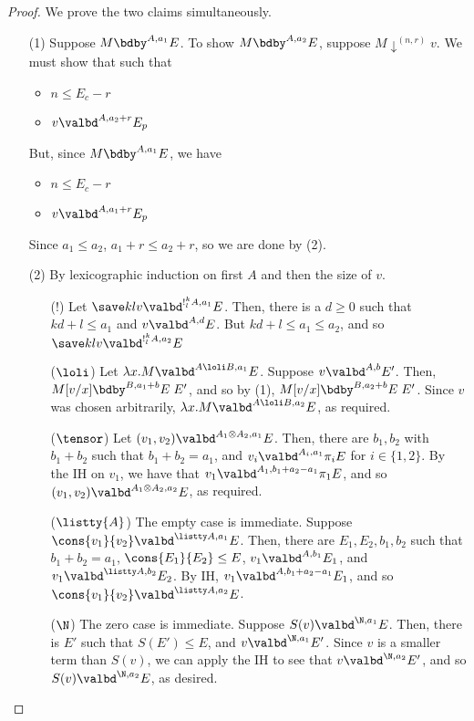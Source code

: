 \credwkn*
\begin{proof}
  We prove the two claims simultaneously.
  \begin{enumerate}
   \item[(1)] Suppose $M \bdby^{A,a_1} E$. To show $M \bdby^{A,a_2} E$, suppose $M \downarrow^{(n,r)} v$. We must show that
   such that
   \begin{itemize}
     \item $n \leq E_c - r$
     \item $v \valbd^{A,a_2+r} E_p$
   \end{itemize}
   But, since $M \bdby^{A,a_1} E$, we have
   \begin{itemize}
     \item $n \leq E_c - r$
     \item $v \valbd^{A,a_1 + r} E_p$
   \end{itemize}
  Since $a_1 \leq a_2$, $a_1 + r \leq a_2+ r$, so we are done by (2).
  \item[(2)] By lexicographic induction on first $A$ and then the size of $v$.
  \begin{itemize}
       \item[($!$)] Let $\save k l v \valbd^{!^k_l A,a_1} E$. Then, there is a $d \geq 0$ such that $kd + l \leq a_1$ and $v \valbd^{A,d} E$. But $kd+l\leq a_1 \leq a_2$, and so $\save k l v \valbd^{!^k_l A,a_2} E$
       \item[($\loli$)] Let $\lambda x.M \valbd^{A \loli B,a_1} E$. Suppose $v \valbd^{A,b} E'$. Then, $M[v/x] \bdby^{B,a_1 + b} E \; E'$, and so by (1), $M[v/x] \bdby^{B,a_2 + b} E \; E'$. Since $v$ was chosen arbitrarily, $\lambda x.M \valbd^{A \loli B,a_2} E$, as required.
    \item[($\tensor$)] Let $(v_1,v_2) \valbd^{A_1 \otimes A_2,a_1} E$. Then, there are $b_1,b_2$ with $b_1 + b_2$ such that $b_1 + b_2 = a_1$, and $v_i \valbd^{A_i,a_1} \pi_i E$ for $i \in \{1,2\}$. By the IH on $v_1$, we have that $v_1 \valbd^{A_1,b_1 + a_2 - a_1} \pi_1 E$, and so $(v_1,v_2) \valbd^{A_1 \otimes A_2,a_2} E$, as required.
    \item[($\listty{A}$)] The empty case is immediate. Suppose $\cons {v_1} {v_2} \valbd^{\listty A, a_1} E$. Then, there are $E_1, E_2,b_1,b_2$ such that $b_1 + b_2 = a_1$, $\cons {E_1} {E_2} \leq E$, $v_1 \valbd^{A,b_1} E_1$, and $v_1 \valbd^{\listty A,b_2} E_2$. By IH, $v_1 \valbd^{A,b_1 + a_2 - a_1} E_1$, and so $\cons {v_1} {v_2} \valbd^{\listty A, a_2} E$.
    \item[($\N$)] The zero case is immediate. Suppose $S(v) \valbd^{\N,a_1} E$. Then, there is $E'$ such that $S(E') \leq E$, and $v \valbd^{\N,a_1} E'$. Since $v$ is a smaller term than $S(v)$, we can apply the IH to see that $v \valbd^{\N,a_2} E'$, and so $S(v) \valbd^{\N,a_2} E$, as desired.

\end{itemize}
\end{enumerate}
\end{proof}
